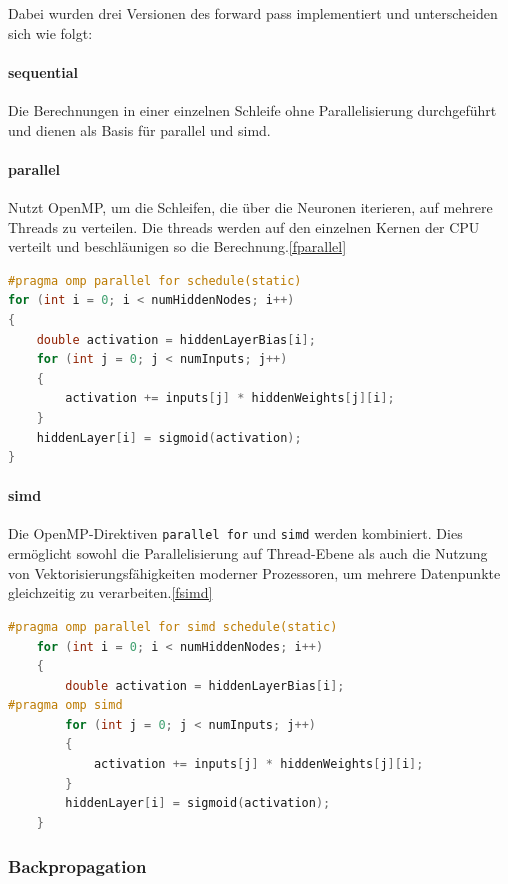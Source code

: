 \documentclass[a4paper, 12pt]{article}
\begin{document}
Dabei wurden drei Versionen des forward pass implementiert und unterscheiden sich wie folgt:

\paragraph{sequential}

Die Berechnungen in einer einzelnen Schleife ohne Parallelisierung durchgeführt und dienen als Basis für parallel und simd.
\paragraph{parallel}

Nutzt OpenMP, um die Schleifen, die über die Neuronen iterieren, auf mehrere Threads zu verteilen. Die threads werden auf den einzelnen Kernen der CPU verteilt und beschläunigen so die Berechnung.\ref{fparallel}
\begin{lstlisting}[language=C, caption={forwardpass parallel}, label={fparallel}]
#pragma omp parallel for schedule(static)
for (int i = 0; i < numHiddenNodes; i++)
{
    double activation = hiddenLayerBias[i];
    for (int j = 0; j < numInputs; j++)
    {
        activation += inputs[j] * hiddenWeights[j][i];
    }
    hiddenLayer[i] = sigmoid(activation);
}
\end{lstlisting}

\paragraph{simd}
Die OpenMP-Direktiven \texttt{parallel for} und \texttt{simd} werden kombiniert. Dies ermöglicht sowohl die Parallelisierung auf Thread-Ebene als auch die Nutzung von Vektorisierungsfähigkeiten moderner Prozessoren, um mehrere Datenpunkte gleichzeitig zu verarbeiten.\ref{fsimd}
\begin{lstlisting}[language=C, caption={forwardpass simd}, label={fsimd}]
#pragma omp parallel for simd schedule(static)
    for (int i = 0; i < numHiddenNodes; i++)
    {
        double activation = hiddenLayerBias[i];
#pragma omp simd
        for (int j = 0; j < numInputs; j++)
        {
            activation += inputs[j] * hiddenWeights[j][i];
        }
        hiddenLayer[i] = sigmoid(activation);
    }
\end{lstlisting}


\subsubsection{Backpropagation}
\end{document}
